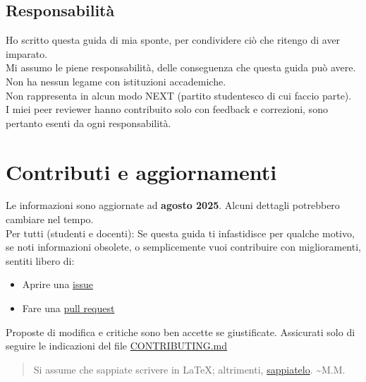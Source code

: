 \documentclass[18pt]{extarticle}
\begin{document}
\subsection{Responsabilità}
Ho scritto questa guida di mia sponte, per condividere ciò che ritengo di aver imparato.\\
Mi assumo le piene responsabilità, delle conseguenza che questa guida può avere.\\
Non ha nessun legame con istituzioni accademiche.\\
Non rappresenta in alcun modo NEXT (partito studentesco di cui faccio parte).\\
I miei peer reviewer hanno contribuito solo con feedback e correzioni, sono pertanto esenti da ogni responsabilità.\\

\section{Contributi e aggiornamenti}
Le informazioni sono aggiornate ad \textbf{agosto 2025}. Alcuni dettagli potrebbero cambiare nel tempo.\\
Per tutti (studenti e docenti): Se questa guida ti infastidisce per qualche motivo, se noti informazioni obsolete, o semplicemente vuoi contribuire con miglioramenti, sentiti libero di:
\begin{itemize}
    \item Aprire una \href{https://github.com/Verryx-02/Scuola-di-sopravvivenza-per-studenti-di-Informatica/issues}{issue}
    \item Fare una \href{https://github.com/Verryx-02/Scuola-di-sopravvivenza-per-studenti-di-Informatica/pulls}{pull request}
\end{itemize}
Proposte di modifica e critiche sono ben accette se giustificate. Assicurati solo di seguire le indicazioni del file \href{https://github.com/Verryx-02/Scuola-di-sopravvivenza-per-studenti-di-Informatica/blob/main/CONTRIBUTING.md}{CONTRIBUTING.md}
\begin{quote}
Si assume che sappiate scrivere in \LaTeX; altrimenti, \href{https://www.learnlatex.org/it/}{sappiatelo}. \textasciitilde M.M.
\end{quote}

\clearpage
\end{document}
